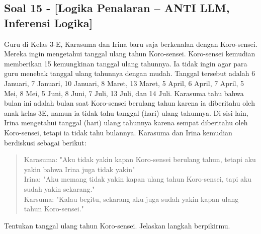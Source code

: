 \documentclass[12pt,a4paper]{article}
\begin{document}
\subsection*{Soal 15 - [Logika Penalaran -- ANTI LLM, Inferensi Logika]}
Guru di Kelas 3-E, Karasuma dan Irina baru saja berkenalan dengan Koro-sensei. Mereka ingin mengetahui tanggal ulang tahun Koro-sensei. Koro-sensei kemudian memberikan 15 kemungkinan tanggal ulang tahunnya. Ia tidak ingin agar para  guru menebak tanggal ulang tahunnya dengan mudah. Tanggal tersebut adalah
6 Januari, 7 Januari, 10 Januari, 8 Maret, 13 Maret, 5 April, 6 April, 7 April, 5 Mei, 8 Mei, 5 Juni, 8 Juni, 7 Juli, 13 Juli, dan 14 Juli.
Karasuma tahu bahwa bulan ini adalah bulan saat Koro-sensei berulang tahun karena ia diberitahu oleh anak kelas 3E, namun ia tidak tahu tanggal (hari) ulang tahunnya. Di sisi lain, Irina mengetahui tanggal (hari) ulang tahunnya karena sempat diberitahu oleh Koro-sensei, tetapi ia tidak tahu bulannya. Karasuma dan Irina kemudian berdiskusi sebagai berikut:
\begin{quote}
    Karasuma: "Aku tidak yakin kapan Koro-sensei berulang tahun, tetapi aku yakin bahwa Irina juga tidak yakin"\\
    Irina: "Aku memang tidak yakin kapan ulang tahun Koro-sensei, tapi aku sudah yakin sekarang."\\
    Karsuma: "Kalau begitu, sekarang aku juga sudah yakin kapan ulang tahun Koro-sensei."
\end{quote}
Tentukan tanggal ulang tahun Koro-sensei. Jelaskan langkah berpikirmu.
\end{document}
